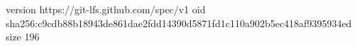 version https://git-lfs.github.com/spec/v1
oid sha256:c9cdb88b18943de861dae2fdd14390d5871fd1c110a902b5ec418af9395934ed
size 196
